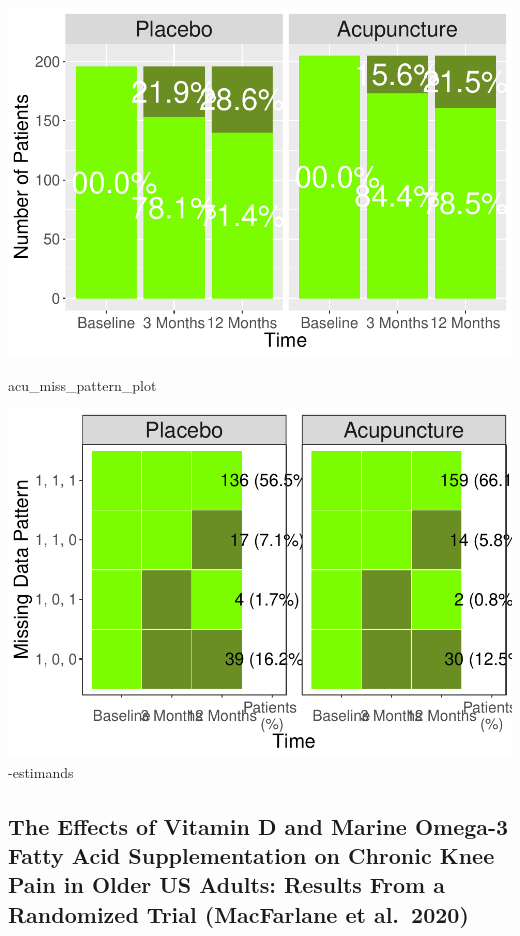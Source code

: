 \documentclass{article}
\newenvironment{Shaded}{\begin{snugshade}}{\end{snugshade}}
\newcommand{\NormalTok}[1]{#1}
\newcommand{\pandocbounded}[1]{#1}
\begin{document}
\pandocbounded{\includegraphics[keepaspectratio]{Final_Report_files/figure-latex/unnamed-chunk-1-2.pdf}}

\begin{Shaded}
\begin{Highlighting}[]
\NormalTok{acu\_miss\_pattern\_plot}
\end{Highlighting}
\end{Shaded}

\pandocbounded{\includegraphics[keepaspectratio]{Final_Report_files/figure-latex/unnamed-chunk-1-3.pdf}}
-estimands

\subsection{The Effects of Vitamin D and Marine Omega-3 Fatty Acid
Supplementation on Chronic Knee Pain in Older US Adults: Results From a
Randomized Trial (MacFarlane et
al.~2020)}\label{the-effects-of-vitamin-d-and-marine-omega-3-fatty-acid-supplementation-on-chronic-knee-pain-in-older-us-adults-results-from-a-randomized-trial-macfarlane-et-al.-2020}
\end{document}
